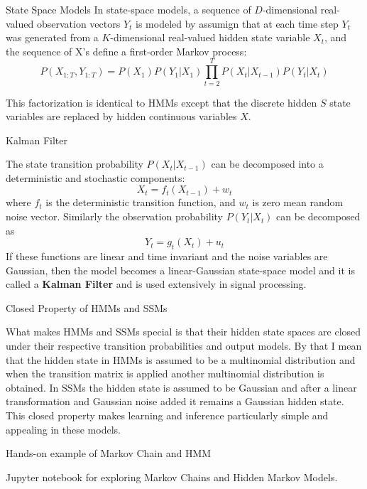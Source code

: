 \documentclass[12pt]{beamer}
\begin{document}
\begin{frame}{State Space Models}
  In state-space models, a sequence of $D$-dimensional real-valued observation vectors $Y_t$ is modeled by assumign that at each time step $Y_t$ was generated from a $K$-dimensional real-valued hidden state variable $X_t$, and the sequence of X's define a first-order Markov process:
  \[
P(X_{1:T}, Y_{1:T}) = P(X_1) P(Y_1|X_1) \prod_{t=2}^{T} P(X_t|X_{t-1})P(Y_t|X_t)
\]

This factorization is identical to HMMs except that the discrete hidden $S$ state variables are replaced by hidden continuous variables $X$. 

  \end{frame} 

\begin{frame}{Kalman Filter}

  The state transition probability $P(X_t|X_{t-1})$ can be decomposed into
  a deterministic and stochastic components:
  \[
  X_t = f_t(X_{t-1}) + w_t 
  \]
  where $f_t$ is the deterministic transition function, and $w_t$ is zero mean
  random noise vector. Similarly the observation probability $P(Y_t|X_t)$ can
  be decomposed as
  \[
  Y_t = g_t(X_t) + u_t 
  \]
  If these functions are linear and time invariant and the noise variables
  are Gaussian, then the model becomes a linear-Gaussian state-space model
  and it is called a {\bf Kalman Filter} and is used extensively in signal processing. 
\end{frame}

\begin{frame}{Closed Property of HMMs and SSMs}

  What makes HMMs and SSMs special is that their hidden state spaces
  are closed under their respective transition probabilities and
  output models. By that I mean that the hidden state in HMMs is
  assumed to be a multinomial distribution and when the transition
  matrix is applied another multinomial distribution is obtained. In
  SSMs the hidden state is assumed to be Gaussian and after a linear
  transformation and Gaussian noise added it remains a Gaussian hidden
  state. This closed property makes learning and inference
  particularly simple and appealing in these models.

\end{frame}

\begin{frame}{Hands-on example of Markov Chain and HMM} 

  Jupyter notebook for exploring Markov Chains and Hidden Markov
  Models.
\end{frame} 
\end{document}
